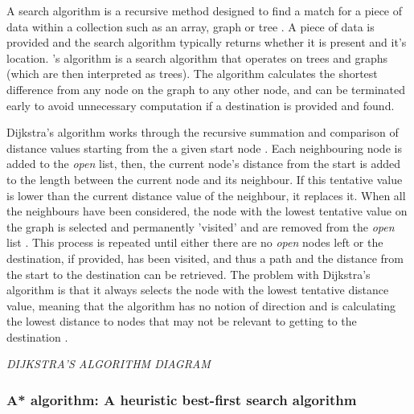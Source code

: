 \documentclass[11pt, a4paper]{article}
\begin{document}
A search algorithm is a recursive method designed to find a match for a piece of data within a collection such as an array, graph or tree \parencite{friedman1976algorithm}. A piece of data is provided and the search algorithm typically returns whether it is present and it's location. \citeauthor{dijkstra1959note}'s algorithm \parencite*{dijkstra1959note} is a search algorithm that operates on trees and graphs (which are then interpreted as trees). The algorithm calculates the shortest difference from any node on the graph to any other node, and can be terminated early to avoid unnecessary computation if a destination is provided and found.

Dijkstra's algorithm works through the recursive summation and comparison of distance values starting from the a given start node \parencite[269]{dijkstra1959note}. Each neighbouring node is added to the \emph{open} list, then, the current node's distance from the start is added to the length between the current node and its neighbour. If this tentative value is lower than the current distance value of the neighbour, it replaces it. When all the neighbours have been considered, the node with the lowest tentative value on the graph is selected and permanently 'visited' and are removed from the \emph{open} list \parencite{dijkstra1959note}. This process is repeated until either there are no \emph{open} nodes left or the destination, if provided, has been visited, and thus a path and the distance from the start to the destination can be retrieved. The problem with Dijkstra's algorithm is that it always selects the node with the lowest tentative distance value, meaning that the algorithm has no notion of direction and is calculating the lowest distance to nodes that may not be relevant to getting to the destination \parencite[214]{millington2019ai}.

\emph{DIJKSTRA'S ALGORITHM DIAGRAM}

\subsubsection{A* algorithm: A heuristic best-first search algorithm}
\end{document}

